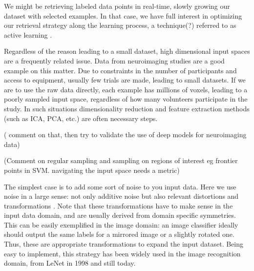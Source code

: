 \documentclass[twocolumn]{article}
\begin{document}
We might be retrieving labeled data points in real-time, slowly growing our dataset with selected examples. In that case, we have full interest in optimizing our retrieval strategy along the learning process, a technique(?) referred to as active learning \cite{Settles2010Active}. 

Regardless of the reason leading to a small dataset, high dimensional input spaces are a frequently related issue. Data from neuroimaging studies are a good example on this matter. Due to constraints in the number of participants and access to equipment, usually few trials are made, leading to small datasets. If we are to use the raw data directly, each example has millions of voxels, leading to a poorly sampled input space, regardless of how many volunteers participate in the study. In such situations dimensionality reduction and feature extraction methods (such as ICA\cite{Hyvarinen2000Independent}, PCA, etc.) are often necessary steps.

(\cite{Plis2014Deep} comment on that, then try to validate the use of deep models for neuroimaging data)

(Comment on regular sampling and sampling on regions of interest eg frontier points in SVM. navigating the input space needs a metric)

The simplest case is to add some sort of noise to you input data. Here we use noise in a large sense: not only additive noise but also relevant distortions and transformations \cite{Poggio1992Recognition, Simard2003Best}. Note that these transformations have to make sense in the input data domain, and are usually derived from domain specific symmetries. This can be easily exemplified in the image domain: an image classifier ideally should output the same labels for a mirrored image or a slightly rotated one. Thus, these are appropriate transformations to expand the input dataset. 
Being easy to implement, this strategy has been widely used in the image recognition domain, from LeNet \cite{Lecun1998Gradient} in 1998 and still today. 
\end{document}
